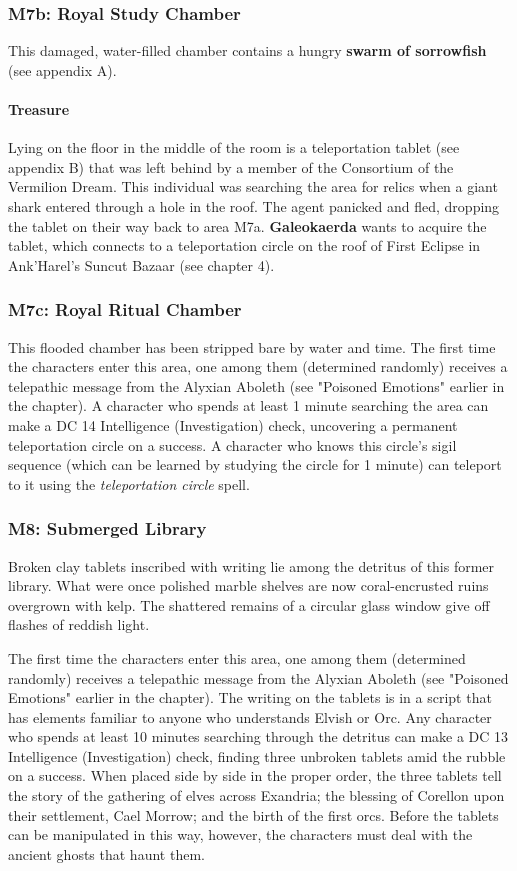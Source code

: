 \documentclass[10pt,a4,twoside,twocolumn,openany,nodeprecatedcode]{dndbook}
\begin{document}
\subsubsection{M7b: Royal Study Chamber}
This damaged, water-filled chamber contains a hungry \textbf{swarm of sorrowfish} (see appendix A).
\paragraph{Treasure}
Lying on the floor in the middle of the room is a teleportation tablet (see appendix B) that was left behind by a member of the Consortium of the Vermilion Dream. This individual was searching the area for relics when a giant shark entered through a hole in the roof. The agent panicked and fled, dropping the tablet on their way back to area M7a. \textbf{Galeokaerda} wants to acquire the tablet, which connects to a teleportation circle on the roof of First Eclipse in Ank'Harel's Suncut Bazaar (see chapter 4).
\subsubsection{M7c: Royal Ritual Chamber}
This flooded chamber has been stripped bare by water and time.
The first time the characters enter this area, one among them (determined randomly) receives a telepathic message from the Alyxian Aboleth (see "Poisoned Emotions" earlier in the chapter).
A character who spends at least 1 minute searching the area can make a DC 14 Intelligence (Investigation) check, uncovering a permanent teleportation circle on a success. A character who knows this circle's sigil sequence (which can be learned by studying the circle for 1 minute) can teleport to it using the \textit{teleportation circle} spell.
\subsubsection{M8: Submerged Library}
\begin{DndReadAloud}{}
Broken clay tablets inscribed with writing lie among the detritus of this former library. What were once polished marble shelves are now coral-encrusted ruins overgrown with kelp. The shattered remains of a circular glass window give off flashes of reddish light.
\end{DndReadAloud}

The first time the characters enter this area, one among them (determined randomly) receives a telepathic message from the Alyxian Aboleth (see "Poisoned Emotions" earlier in the chapter).
The writing on the tablets is in a script that has elements familiar to anyone who understands Elvish or Orc. Any character who spends at least 10 minutes searching through the detritus can make a DC 13 Intelligence (Investigation) check, finding three unbroken tablets amid the rubble on a success.
When placed side by side in the proper order, the three tablets tell the story of the gathering of elves across Exandria; the blessing of Corellon upon their settlement, Cael Morrow; and the birth of the first orcs. Before the tablets can be manipulated in this way, however, the characters must deal with the ancient ghosts that haunt them.
\end{document}
